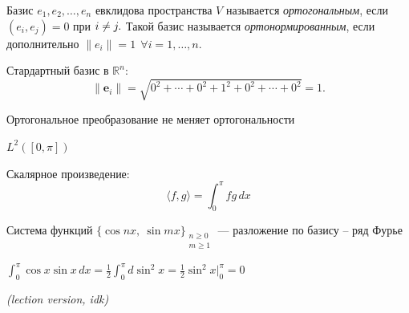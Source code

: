 \begin{definition}
    Базис $e_1, e_2, \dots , e_n$ евклидова пространства $V$ называется \emph{ортогональным}, если $(e_i, e_j) = 0$ при $i \neq j.\\$
    Такой базис называется \emph{ортонормированным}, если дополнительно $\|e_i\| = 1 \ \ \forall i = 1, \dots ,n.$
\end{definition}

\begin{example}
    Стардартный базис в $\mathbb{R}^n$:
    \[
    \|\mathbf{e}_i\| = \sqrt{0^2 + \cdots + 0^2 + 1^2 + 0^2 + \cdots + 0^2} = 1.
    \]
\end{example}

\begin{stmt}
    Ортогональное преобразование не меняет ортогональности

  \begin{center}
  \end{center}
\end{stmt}


\begin{example}
    
$L^2([0,\pi])$

Скалярное произведение:
\[
\langle f,g\rangle = \int_0^\pi fg\,dx
\]

Система функций $\bigl\{\cos nx,\ \sin mx\bigr\}_{\substack{n \geq 0 \\ m \geq 1}}$
--- разложение по базису -- ряд Фурье


$\int_0^\pi \cos x \sin x \, dx = \frac{1}{2} \int_0^\pi d\sin^2 x =
\frac{1}{2} \sin^2 x \Big|_0^\pi = 0 $
\par
 
\emph{(lection version, idk)}

\end{example}


